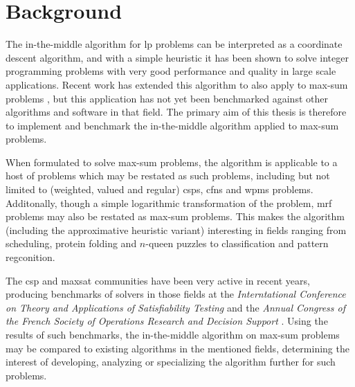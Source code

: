 \section{Background}
The in-the-middle algorithm \parencite{Wedelin95} for \gls{lp} problems can be interpreted as a coordinate descent algorithm, and with a simple heuristic it has been shown to solve integer programming problems with very good performance and quality in large scale applications.
Recent work has extended this algorithm to also apply to max-sum problems \parencites{Wedelin08}{Wedelin13}, but this application has not yet been benchmarked against other algorithms and software in that field.
The primary aim of this thesis is therefore to implement and benchmark the in-the-middle algorithm applied to max-sum problems.

When formulated to solve max-sum problems, the algorithm is applicable to a host of problems which may be restated as such problems, including but not limited to (weighted, valued and regular) \glspl{csp}, \glspl{cfn} and \gls{wpms} problems.
Additonally, though a simple logarithmic transformation of the problem, \gls{mrf} problems may also be restated as max-sum problems.
This makes the algorithm (including the approximative heuristic variant) interesting in fields ranging from scheduling, protein folding and \(n\)-queen puzzles to classification and pattern regconition.

The \gls{csp} and \gls{maxsat} communities have been very active in recent years, producing benchmarks of solvers in those fields at the \emph{Interntational Conference on Theory and Applications of Satisfiability Testing} \parencite{Argelich11} and the \emph{Annual Congress of the French Society of Operations Research and Decision Support} \parencite{Allouche14b}.
Using the results of such benchmarks, the in-the-middle algorithm on max-sum problems may be compared to existing algorithms in the mentioned fields, determining the interest of developing, analyzing or specializing the algorithm further for such problems.
